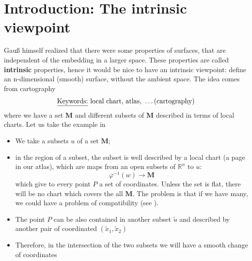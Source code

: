 \documentclass[../main.tex]{subfiles}
\begin{document}
\section[The intrinsic viewpoint]{Introduction: The intrinsic viewpoint}
Gauß himself realized that there were some properties of surfaces, that are independent of the embedding in a larger space. These properties are called \textbf{intrinsic} properties, hence it would be nice to have an intrinsic viewpoint: define an n-dimensional (smooth) surface, without the ambient space. The idea comes from cartography
\[
\textrm{\underline{Keywords:} local chart, atlas, } \dots \textrm{(cartography)}
\]
where we have a set $\mathbf{M}$ and different subsets of $\mathbf{M}$ described in terms of local charts. Let us take the example in 
\begin{itemize}
    \item We take a subsets $u$ of a set $\mathbf{M}$;
    \item in the region of a subset, the subset is well described by a local chart (a page in our atlas), which are maps from an open subsets of $\mathbb{R}^n$ to $u$:
    \[
    \varphi^{-1}(w)\to\mathbf{M}
    \]
    which give to every point $P$ a set of coordinates. Unless the set is flat, there will be no chart which covers the all $\mathbf{M}$. The problem is that if we have many, we could have a problem of compatibility (see ).
    \item The point $P$ can be also contained in another subset $\tilde{u}$ and described by another pair of coordinated $(\tilde{x}_1, \tilde{x}_2)$
    \item Therefore, in the intersection of the two subsets we will have a smooth change of coordinates 
\end{itemize} 
\end{document}
